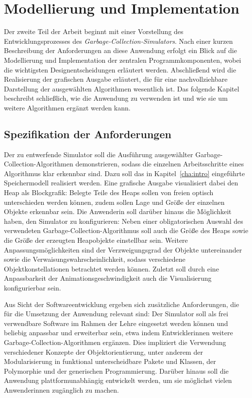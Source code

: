 \chapter{Modellierung und Implementation}
\label{cha:modelling}

Der zweite Teil der Arbeit beginnt mit einer Vorstellung des Entwicklungsprozesses des \textit{Garbage-Collection-Simulators}.
Nach einer kurzen Beschreibung der Anforderungen an diese Anwendung erfolgt ein Blick auf die Modellierung und Implementation der zentralen Programmkomponenten, wobei die wichtigsten Designentscheidungen erläutert werden.
Abschließend wird die Realisierung der grafischen Ausgabe erläutert, die für eine nachvollziehbare Darstellung der ausgewählten Algorithmen wesentlich ist.
Das folgende Kapitel beschreibt schließlich, wie die Anwendung zu verwenden ist und wie sie um weitere Algorithmen ergänzt werden kann.

\section{Spezifikation der Anforderungen}
\label{sec:requirements}
Der zu entwerfende Simulator soll die Ausführung ausgewählter Garbage-Collection-Algorithmen demonstrieren, sodass die einzelnen Arbeitsschritte eines Algorithmus klar erkennbar sind.
Dazu soll das in Kapitel~\ref{cha:intro} eingeführte Speichermodell realisiert werden.
Eine grafische Ausgabe visualisiert dabei den Heap als Blockgrafik: Belegte Teile des Heaps sollen von freien optisch unterschieden werden können, zudem sollen Lage und Größe der einzelnen Objekte erkennbar sein.
Die Anwenderin soll darüber hinaus die Möglichkeit haben, den Simulator zu konfigurieren:
Neben einer obligatorischen Auswahl des verwendeten Garbage-Collection-Algorithmus soll auch die Größe des Heaps sowie die Größe der erzeugten Heapobjekte einstellbar sein.
Weitere Anpassungsmöglichkeiten sind der Verzweigungsgrad der Objekte untereinander sowie die Verwaisungswahrscheinlichkeit, sodass verschiedene Objektkonstellationen betrachtet werden können.
Zuletzt soll durch eine Anpassbarkeit der Animationsgeschwindigkeit auch die Visualisierung konfigurierbar sein.

Aus Sicht der Softwareentwicklung ergeben sich zusätzliche Anforderungen, die für die Umsetzung der Anwendung relevant sind:
Der Simulator soll als frei verwendbare Software im Rahmen der Lehre eingesetzt werden können und beliebig anpassbar und erweiterbar sein, etwa indem Entwicklerinnen weitere Garbage-Collection-Algorithmen ergänzen.
Dies impliziert die Verwendung verschiedener Konzepte der Objektorientierung, unter anderem der Modularisierung in funktional unterscheidbare Pakete und Klassen, der Polymorphie und der generischen Programmierung.
Darüber hinaus soll die Anwendung plattformunabhängig entwickelt werden, um sie möglichst vielen Anwenderinnen zugänglich zu machen.

